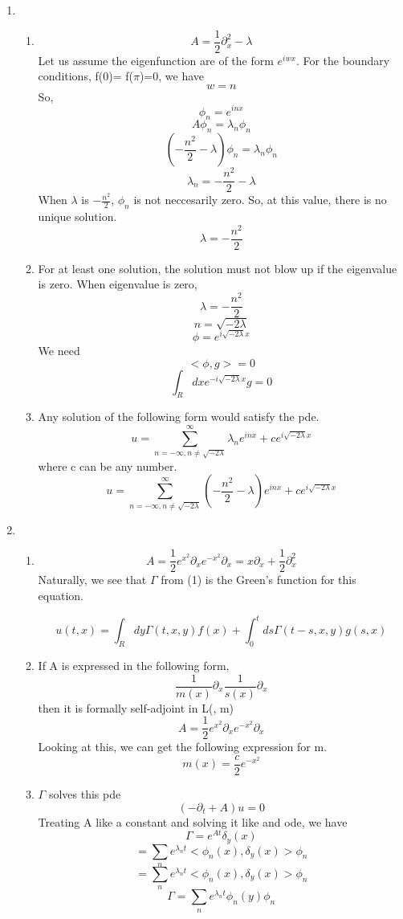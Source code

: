 \documentclass[a4paper,12 pt]{article}
\begin{document}
\begin{enumerate}
\begin{enumerate}
	\end{enumerate}
	\newpage
	\item
\begin{enumerate}
	\item
	\[ A = \frac{1}{2}\partial_x^2 -\lambda\]
	Let us assume the eigenfunction are of the form $e^{iwx}$. For the boundary conditions, f(0)= f($\pi$)=0, we have
	\[w=n\]
	So, \[\phi_n = e^{inx}\]
	\[A\phi_n= \lambda_n\phi_n\]
	\[(-\frac{n^2}{2}-\lambda)\phi_n= \lambda_n\phi_n\]
	\[\lambda_n=-\frac{n^2}{2}-\lambda\]
	When $\lambda$ is $-\frac{n^2}{2}$, $\phi_n$ is not neccesarily zero. So, at this value, there is no unique solution.
	\[\boxed{\lambda =-\frac{n^2}{2}}\]
	\item
	For at least one solution, the solution must not blow up if the eigenvalue is zero.
	When eigenvalue is zero,
	\[\lambda =-\frac{n^2}{2}\]
	\[n=\sqrt{-2\lambda} \] 
	 \[\phi = e^{i \sqrt{-2\lambda} x}\]
	 We need 
	 \[<\phi, g>=0\]
	 \[\boxed{\int_R dx e^{-i \sqrt{-2\lambda} x}g=0}\]
	\item
	Any solution of the following form would satisfy the pde.
	\[u = \sum_{n=-\infty, n\neq \sqrt{-2\lambda}}^{\infty}\lambda_ne^{inx} + ce^{i \sqrt{-2\lambda} x}\]
	where c can be any number.
		\[\boxed{u = \sum_{n=-\infty, n\neq \sqrt{-2\lambda}}^{\infty}(-\frac{n^2}{2}-\lambda)e^{inx} + ce^{i \sqrt{-2\lambda} x}}\]
\end{enumerate}
\newpage
\item

\begin{enumerate}
	\item 
	\[A = \frac{1}{2} e^{x^2}\partial_xe^{-x^2}\partial_x = x\partial_x + \frac{1}{2}\partial_x^2 \]
	Naturally, we see that $\Gamma$ from (1) is the Green's function for this equation.

	\[\boxed{ u(t,x)= \int_{R} dy\Gamma(t,x,y)f(x)+\int_0^t ds \Gamma(t-s,x,y)g(s,x)} \]
	\item If A is expressed in the following form, \[\frac{1}{m(x)}\partial_x\frac{1}{s(x)}\partial_x\]
	then it is formally self-adjoint in L(, m)
	\[A = \frac{1}{2} e^{x^2}\partial_xe^{-x^2}\partial_x\]
	Looking at this, we can get the following expression for m.
	\[\boxed{m(x)= \frac{c}{2} e^{-x^2}}\]
	
	\item
	$\Gamma$ solves this pde
	\[(-\partial_t +A)u  =0\]
	Treating A like a constant and solving it like and ode, we have
	\[\Gamma = e^{At}\delta_y(x)\]
	\[= \sum_{n}e^{\lambda_nt}<\phi_n(x),\delta_y(x)>\phi_n\]
	\[= \sum_{n}e^{\lambda_nt}<\phi_n(x),\delta_y(x)>\phi_n\]
		\[\boxed{\Gamma= \sum_{n}e^{\lambda_nt}\phi_n(y)\phi_n}\]
\end{enumerate}

	\end{enumerate} 
	
\end{document}
